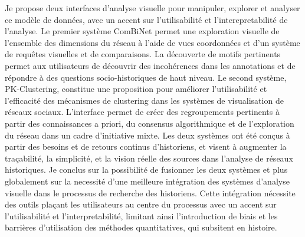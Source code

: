 {    Je propose deux interfaces d'analyse visuelle pour manipuler, explorer et analyser ce modèle de données, avec un accent sur l'utilisabilité et l'interepretabilité de l'analyse.
    Le premier système ComBiNet permet une exploration visuelle de l'ensemble des dimensions du réseau à l'aide de vues coordonnées et d'un système de requêtes visuelles et de comparaisons.
    La découverte de motifs pertinents permet aux utilisateurs de découvrir des incohérences dans les annotations et de répondre à des questions socio-historiques de haut niveau.
    Le second système, PK-Clustering, constitue une proposition pour améliorer l'utilisabilité et l'efficacité des mécanismes de clustering dans les systèmes de visualisation de réseaux sociaux.
    L'interface permet de créer des regroupements pertinents à partir des connaissances a priori, du consensus algorithmique et de l'exploration du réseau dans un cadre d'initiative mixte.
    Les deux systèmes ont été conçus à partir des besoins et de retours continus d'historiens, et visent à augmenter la traçabilité, la simplicité, et la vision réelle des sources dans l'analyse de réseaux historiques.
    Je conclus sur la possibilité de fusionner les deux systèmes et plus globalement sur la necessité d'une meilleure intégration des systèmes d'analyse visuelle dans le processus de recherche des historiens.
    Cette intégration nécessite des outils plaçant les utilisateurs au centre du processus avec un accent sur l'utilisabilité et l'interpretabilité, limitant ainsi l'introduction de biais et les barrières d'utilisation des méthodes quantitatives, qui subsitent en histoire.
}


